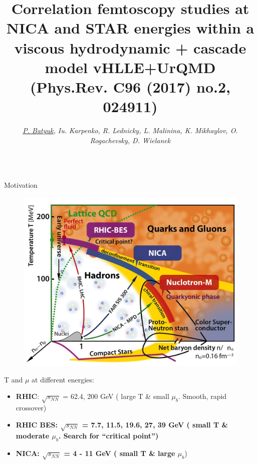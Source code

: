 \documentclass[final,hyperref={pdfpagelabels=false}, xcolor=dvipsnames]{beamer}
\title{ Correlation femtoscopy studies at NICA and STAR energies within a viscous hydrodynamic + cascade model vHLLE+UrQMD (Phys.Rev. C96 (2017) no.2, 024911)}
\author{\textit{\underline{P. Batyuk}, Iu. Karpenko, R. Lednicky, L. Malinina, K. Mikhaylov, O. Rogachevsky, D. Wielanek}}
\institute{VBLHEP, JINR, pavel.batyuk@jinr.ru}
\begin{document}
 \begin{frame}[shrink=30]
 \bf
 
 \begin{columns}[t]
 \begin{block}{Motivation}
 \begin{figure}[T]
    \includegraphics[width=1.\linewidth]{phase.jpg}
 \end{figure}
 \begin{block}{T and $\mu$ at different energies:}
 \begin{itemize}
  \item {\bf RHIC}: $\sqrt{s_{NN}}$ = 62.4, 200 GeV ({\color{red} large T \& small $\mu_{b}$. Smooth, rapid crossover})
  \item {\bf RHIC BES: $\sqrt{s_{NN}}$ = 7.7, 11.5, 19.6, 27, 39 GeV ({\color{red} small T \& moderate $\mu_{b}$. 
  Search for ``critical point''})}
  \item {\bf NICA: $\sqrt{s_{NN}}$ = 4 - 11 GeV ({\color{red} small T \& large $\mu_{b}$}})
  \end{itemize}
 \end{block}
  \end{block}
  

\end{columns}
\end{frame}
\end{document}
